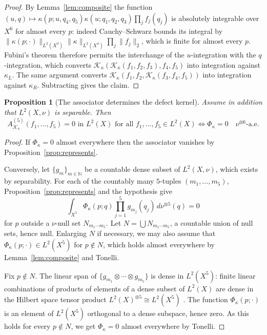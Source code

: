\documentclass[11pt]{amsart}
\newtheorem{proposition}[theorem]{Proposition}
\theoremstyle{definition}
\theoremstyle{remark}
\newcommand{\norm}[1]{\lVert#1\rVert}
\newcommand{\Kop}{\mathcal K}
\begin{document}
\begin{proof}
By Lemma~\ref{lem:composite} the function
$(u,q)\mapsto\kappa(p;u,q_4,q_5)\kappa(u;q_1,q_2,q_3)\prod_jf_j(q_j)$ is absolutely
integrable over $X^{6}$ for almost every $p$: indeed Cauchy--Schwarz bounds its integral
by $\norm{\kappa(p;\cdot)}_{L^{2}(X^{3})}\norm{\kappa}_{L^{2}(X^{4})}\prod_j\norm{f_j}_2$,
which is finite for almost every $p$. Fubini's theorem therefore permits the interchange
of the $u$-integration with the $q$-integration, which converts
$\Kop_\kappa(\Kop_\kappa(f_1,f_2,f_3),f_4,f_5)$ into integration against $\kappa_L$. The
same argument converts $\Kop_\kappa(f_1,f_2,\Kop_\kappa(f_3,f_4,f_5))$ into integration
against $\kappa_R$. Subtracting gives the claim.
\end{proof}

\begin{proposition}[The associator determines the defect kernel]
\label{prop:converse}
Assume in addition that $L^{2}(X,\nu)$ is separable. Then
\[
 A^{(5)}_{\Kop_\kappa}(f_1,\ldots,f_5)=0
 \text{ in }L^{2}(X)\text{ for all }f_1,\ldots,f_5\in L^{2}(X)
 \iff
 \Phi_\kappa=0
 \quad\nu^{\otimes6}\text{-a.e.}
\]
\end{proposition}

\begin{proof}
If $\Phi_\kappa=0$ almost everywhere then the associator vanishes by
Proposition~\ref{prop:represents}.

Conversely, let $\{g_m\}_{m\in\mathbb N}$ be a countable dense subset of $L^{2}(X,\nu)$,
which exists by separability. For each of the countably many $5$-tuples
$(m_1,\ldots,m_5)$, Proposition~\ref{prop:represents} and the hypothesis give
\[
 \int_{X^{5}}\Phi_\kappa(p;q)\prod_{j=1}^{5}g_{m_j}(q_j)\,d\nu^{\otimes5}(q)=0
\]
for $p$ outside a $\nu$-null set $N_{m_1\cdots m_5}$. Let
$N=\bigcup N_{m_1\cdots m_5}$, a countable union of null sets, hence null. Enlarging $N$
if necessary, we may also assume that $\Phi_\kappa(p;\cdot)\in L^{2}(X^{5})$ for
$p\notin N$, which holds almost everywhere by Lemma~\ref{lem:composite} and Tonelli.

Fix $p\notin N$. The linear span of $\{g_{m_1}\otimes\cdots\otimes g_{m_5}\}$ is dense in
$L^{2}(X^{5})$: finite linear combinations of products of elements of a dense subset of
$L^{2}(X)$ are dense in the Hilbert space tensor product $L^{2}(X)^{\otimes5}\cong
L^{2}(X^{5})$ \cite[Sec.~II.4]{ReedSimon1980}. The function $\Phi_\kappa(p;\cdot)$ is an
element of $L^{2}(X^{5})$ orthogonal to a dense subspace, hence zero. As this holds for
every $p\notin N$, we get $\Phi_\kappa=0$ almost everywhere by Tonelli.
\end{proof}
\end{document}
